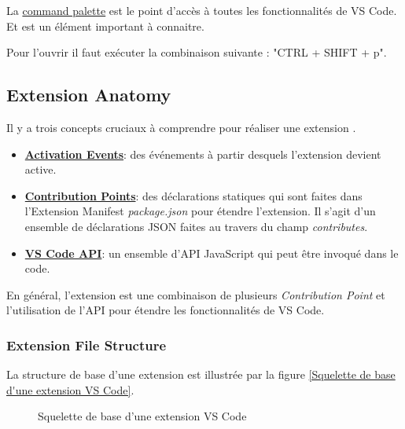 \documentclass[
    iict, %
    il, %
]{heig-tb}
\begin{document}
La \href{https://code.visualstudio.com/docs/getstarted/userinterface#_command-palette}{command palette}
est le point d'accès à toutes les fonctionnalités de VS Code. Et est un élément important à connaitre.

Pour l'ouvrir il faut exécuter la combinaison suivante : "CTRL + SHIFT + p".


\subsection{Extension Anatomy}
Il y a trois concepts cruciaux à comprendre pour réaliser une extension \cite{extension-anatomy} .

\begin{itemize}
    \item \href{https://code.visualstudio.com/api/references/activation-events}{\textbf{Activation Events}}: des événements à partir desquels l'extension devient active.
    \item \href{https://code.visualstudio.com/api/references/contribution-points}{\textbf{Contribution Points}}: des déclarations statiques qui sont faites dans l'Extension Manifest \emph{package.json} pour étendre l'extension. Il s'agit d'un ensemble de déclarations JSON faites au travers du champ \emph{contributes}.
    \item \href{https://code.visualstudio.com/api/references/vscode-api}{\textbf{VS Code API}}: un ensemble d'API JavaScript qui peut être invoqué dans le code.
\end{itemize}

En général, l'extension est une combinaison de plusieurs \emph{Contribution Point} et l'utilisation de l'API pour étendre les fonctionnalités de VS Code.

\subsubsection{Extension File Structure}\label{Extension File Structure}

La structure de base d'une extension est illustrée par la figure \ref{Squelette de base d'une extension VS Code}.

\begin{figure}[H] %
    \centering
    \caption[Squelette de base d'une extension VS Code]{\label{basic-structure} Squelette de base d'une extension VS Code}
\end{figure}
\end{document}
